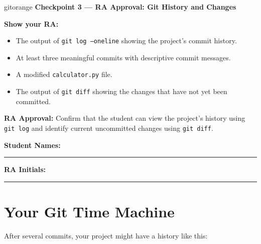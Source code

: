 \documentclass[11pt,a4paper]{article}
\begin{document}
\begin{checkpoint}{gitorange}
\textbf{Checkpoint 3 --- RA Approval: Git History and Changes}

\textbf{Show your RA:}

\begin{itemize}
    \item The output of \texttt{git log --oneline} showing the project's commit history.
    \item At least three meaningful commits with descriptive commit messages.
    \item A modified \texttt{calculator.py} file.
    \item The output of \texttt{git diff} showing the changes that have not yet been committed.
\end{itemize}

\textbf{RA Approval:} Confirm that the student can view the project's history using \texttt{git log} and identify current uncommitted changes using \texttt{git diff}.

\vspace{0.5em}

\textbf{Student Names:} \rule{5cm}{0.4pt} \textbf{RA Initials:} \rule{3cm}{0.4pt}
\end{checkpoint}

\section{Your Git Time Machine}

After several commits, your project might have a history like this:

\begin{center}
\end{center}
\end{document}
